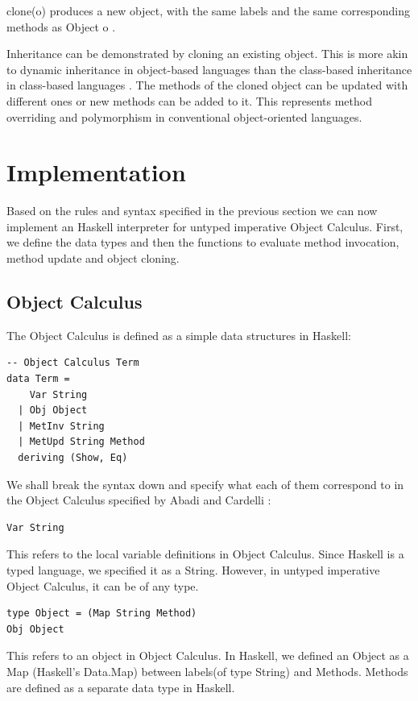 \documentclass[10pt,twocolumn]{article}
\begin{document}
clone(o) produces a new object, with the same labels and the same corresponding methods as Object o \cite{ex11}. 

Inheritance can be demonstrated by cloning an existing object. This is more akin to dynamic inheritance in object-based languages than the class-based inheritance in class-based languages \cite{ex11}. The methods of the cloned object can be updated with different ones or new methods can be added to it. This represents method overriding and polymorphism in conventional object-oriented languages. 

\section{Implementation}

Based on the rules and syntax specified in the previous section we can now implement an Haskell interpreter for untyped imperative Object Calculus. First, we define the data types and then the functions to evaluate method invocation, method update and object cloning. 

\subsection{Object Calculus}
The Object Calculus is defined as a simple data structures in Haskell: 

\begin{lstlisting}
-- Object Calculus Term
data Term =
    Var String
  | Obj Object
  | MetInv String
  | MetUpd String Method
  deriving (Show, Eq)
\end{lstlisting}

We shall break the syntax down and specify what each of them correspond to in the Object Calculus specified by Abadi and Cardelli \cite{ex11}: 

\begin{lstlisting}
Var String
\end{lstlisting}
This refers to the local variable definitions in Object Calculus. Since Haskell is a typed language, we specified it as a String. However, in untyped imperative Object Calculus, it can be of any type. 

\begin{lstlisting}
type Object = (Map String Method)
Obj Object
\end{lstlisting}
This refers to an object in Object Calculus. In Haskell, we defined an Object as a Map (Haskell's Data.Map) between labels(of type String) and Methods. Methods are defined as a separate data type in Haskell. 
\end{document}
